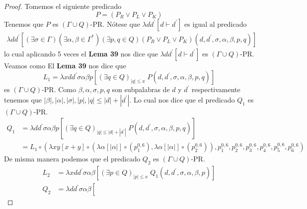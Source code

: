 \begin{proof}
    \noindent Tomemos el siguiente predicado
    \[
      P = (P_{R}\vee P_{L}\vee P_{K})
    \]
    Tenemos que $P$ es $(\Gamma \cup Q)$-PR.
    \noindent Nótese que $\lambda dd^{\prime }\left[ d\vdash d^{\prime }\right] $ es igual al predicado
    \begin{eqnarray}
      \nonumber \lambda dd^{\prime }\left[ (\exists \sigma \in \Gamma )(\exists \alpha ,\beta \in \Gamma ^{\ast })
                (\exists p,q\in Q)(P_{R}\vee P_{L}\vee P_{K})(d,d^{\prime },\sigma ,\alpha ,\beta ,p,q)\right]
    \end{eqnarray}
    lo cual aplicando 5 veces el \textbf{Lema 39} nos dice que $\lambda dd^{\prime } \left[ d\vdash d^{\prime }\right]$
    es $(\Gamma \cup Q)$-PR. Veamos como
    El \textbf{Lema 39} nos dice que
    \[
      L_1 = \lambda x d d^{\prime }\sigma\alpha\beta p
              \left[
                (\exists q\in Q)_{|q| \leq x}\; P(d,d^{\prime },\sigma ,\alpha ,\beta ,p,q)
              \right]
    \]
    es $(\Gamma \cup Q)$-PR. Como $\beta, \alpha, \sigma, p, q$ son subpalabras de $d$ y $d^{\prime}$ respectivamente
    tenemos que $ |\beta|, |\alpha|, |\sigma|, |p|, |q| \leq |d| + |d^{\prime}|$. Lo cual nos dice que el predicado
    $Q_1$ es $(\Gamma \cup Q)$-PR.
    \begin{align*}
      Q_1 &=  \lambda d d^{\prime }\sigma\alpha\beta p
                \left[
                  (\exists q\in Q)_{|q| \leq |d| + |d^{\prime}|}\; P(d,d^{\prime },\sigma ,\alpha ,\beta ,p,q)
                \right] \\[10pt]
          &= L_1  \circ (
                    \lambda x y \left[ x + y \right]
                      \circ(
                        \lambda \alpha \left[ |\alpha|\right] \circ (p_{1}^{0,6}),
                        \lambda \alpha \left[ |\alpha|\right] \circ (p_{2}^{0,6})
                    ),
                    p_{1}^{0,6},
                    p_{2}^{0,6},
                    p_{3}^{0,6},
                    p_{4}^{0,6},
                    p_{5}^{0,6},
                    p_{6}^{0,6}
                  )
    \end{align*}
    De misma manera podemos que el predicado $Q_2$ es $(\Gamma \cup Q)$-PR.
    \begin{align*}
      L_2 &=  \lambda x d d^{\prime }\sigma\alpha\beta
                \left[
                  (\exists p\in Q)_{|p| \leq x}\; Q_1(d,d^{\prime },\sigma ,\alpha ,\beta , p)
                \right] \\[10pt]
      Q_2 &=  \lambda d d^{\prime }\sigma\alpha\beta
                \left[

\end{align*}
\end{proof}
